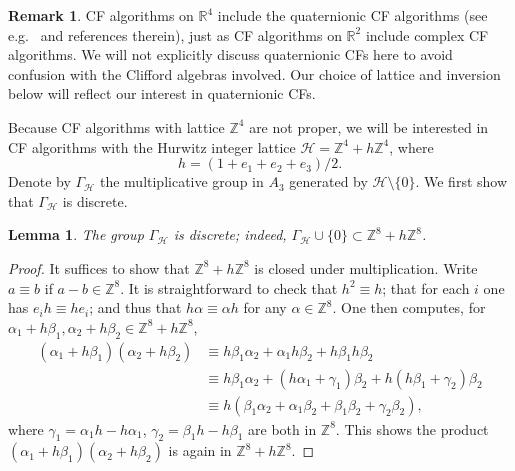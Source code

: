 \documentclass[reqno,10pt]{amsart}
\newcommand{\R}{\mathbb{R}}
\newcommand{\Z}{\mathbb{Z}}
\newtheorem{lemma}[thm]{Lemma}
\numberwithin{thm}{section}
\theoremstyle{definition}
\theoremstyle{definition}
\newtheorem{remark}[thm]{Remark}
\numberwithin{equation}{section}
\begin{document}
\begin{remark}
CF algorithms on $\R^4$ include the quaternionic CF algorithms (see e.g.~\cite{lukyanenko2022convergence} and references therein), just as CF algorithms on $\R^2$ include complex CF algorithms. We will not explicitly discuss quaternionic CFs here to avoid confusion with the Clifford algebras involved. Our choice of lattice and inversion below will reflect our interest in quaternionic CFs.
\end{remark}



Because CF algorithms with lattice $\Z^4$ are not proper, we will be interested in CF algorithms with the Hurwitz integer lattice $\mathcal{H}=\Z^4+h \Z^4$, where $$h=(1+e_1+e_2+e_3)/2.$$ Denote by $\Gamma_\mathcal{H}$ the multiplicative group in $A_3$ generated by $\mathcal{H}\setminus \{0\}$. We first show that $\Gamma_\mathcal{H}$ is discrete. 

\begin{lemma} The group $\Gamma_\mathcal{H}$ is discrete; indeed, 
$\Gamma_\mathcal{H}\cup\{0\}\subset \mathbb{Z}^8 +h\mathbb{Z}^8$.
\end{lemma}

\begin{proof}
It suffices to show that $\mathbb{Z}^8 +h\mathbb{Z}^8$ is closed under multiplication. Write $a \equiv b$ if $a-b\in \Z^8$. It is straightforward to check that $h^2\equiv h$; that for each $i$ one has $e_i h \equiv h e_i$; and thus that $h\alpha \equiv \alpha h$ for any $\alpha \in \Z^8$. One then computes, for $\alpha_1+h\beta_1, \alpha_2+h\beta_2\in \Z^8 + h\Z^8$,
\begin{align*}
(\alpha_1+h\beta_1)(\alpha_2+h\beta_2)
& \equiv h\beta_1\alpha_2+\alpha_1h\beta_2+h\beta_1h\beta_2\\
&\equiv h\beta_1\alpha_2 + (h\alpha_1+\gamma_1)\beta_2+h(h\beta_1+\gamma_2)\beta_2 \\
&\equiv h (\beta_1\alpha_2+\alpha_1\beta_2+\beta_1\beta_2 +\gamma_2\beta_2),
\end{align*}
where $\gamma_1=\alpha_1h-h\alpha_1$, $\gamma_2=\beta_1 h-h\beta_1$ are both in $\Z^8$. This shows the product $(\alpha_1+h\beta_1)(\alpha_2+h\beta_2)$ is again in $\Z^8+h\Z^8$.
\end{proof}
\end{document}

